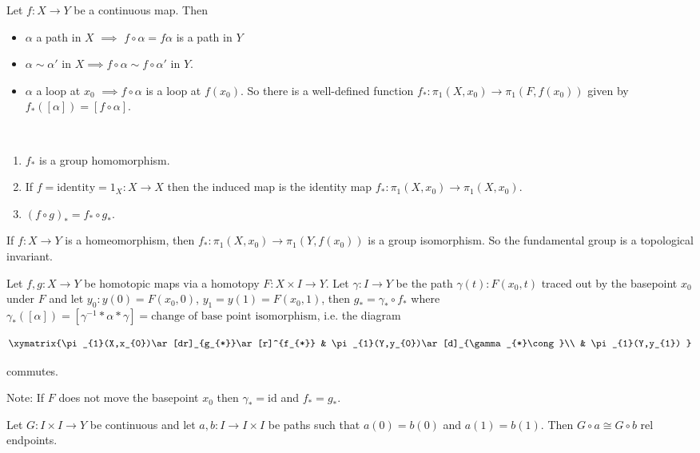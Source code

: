 Let $f:X\to Y$ be a continuous map. Then
\begin{itemize}
\item $\alpha$ a path in $X$ $\implies$ $f\circ\alpha=f\alpha$ is a
path in $Y$
\item $\alpha\sim\alpha'$ in $X\implies f\circ\alpha\sim f\circ\alpha'$
in $Y$.
\item $\alpha$ a loop at $x_{0}$ $\implies f\circ\alpha$ is a loop at
$f(x_{0})$. So there is a well-defined function $f_{*}:\pi_{1}(X,x_{0})\to\pi_{1}(F,f(x_{0}))$
given by $f_{*}([\alpha])=[f\circ\alpha]$.\end{itemize}
\begin{thm}
~\end{thm}
\begin{enumerate}
\item $f_{*}$ is a group homomorphism.
\item If $f=\text{identity}=1_{X}:X\to X$ then the induced map is the identity
map $f_{*}:\pi_{1}(X,x_{0})\to\pi_{1}(X,x_{0})$.
\item $(f\circ g)_{*}=f_{*}\circ g_{*}$.\end{enumerate}
\begin{cor}
If $f:X\to Y$ is a homeomorphism, then $f_{*}:\pi_{1}(X,x_{0})\to\pi_{1}(Y,f(x_{0}))$
is a group isomorphism. So the fundamental group is a topological
invariant.\end{cor}
\begin{thm}
Let $f,g:X\to Y$ be homotopic maps via a homotopy $F:X\times I\to Y$.
Let $\gamma:I\to Y$ be the path $\gamma(t):F(x_{0},t)$ traced out
by the basepoint $x_{0}$ under $F$ and let $y_{0}:y(0)=F(x_{0},0)$,
$y_{1}=y(1)=F(x_{0},1)$, then $g_{*}=\gamma_{*}\circ f_{*}$ where
$\gamma_{*}([\alpha])=[\gamma^{-1}*\alpha*\gamma]=\text{change of base point isomorphism}$,
i.e. the diagram

\begin{align*}
\xymatrix{\pi_{1}(X,x_{0})\ar[dr]_{g_{*}}\ar[r]^{f_{*}} & \pi_{1}(Y,y_{0})\ar[d]_{\gamma_{*}\cong}\\
 & \pi_{1}(Y,y_{1})
}
\end{align*}


commutes.

Note: If $F$ does not move the basepoint $x_{0}$ then $\gamma_{*}=\text{id}$
and $f_{*}=g_{*}$.\end{thm}
\begin{lem}
Let $G:I\times I\to Y$ be continuous and let $a,b:I\to I\times I$
be paths such that $a(0)=b(0)$ and $a(1)=b(1)$. Then $G\circ a\cong G\circ b$
rel endpoints.
\end{lem}
